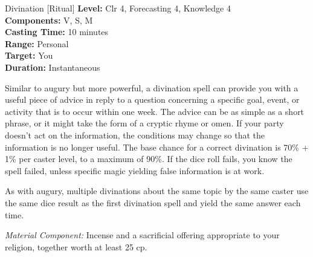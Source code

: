 {Divination [Ritual]}
{
	\textbf{Level:}
	Clr 4, Forecasting 4, Knowledge 4\\
	\textbf{Components:}
	V, S, M\\
	\textbf{Casting Time:}
	10 minutes\\
	\textbf{Range:}
	Personal\\
	\textbf{Target:}
	You\\
	\textbf{Duration:}
	Instantaneous\\
}
{
	Similar to augury but more powerful, a divination spell can provide you with a useful piece of advice in reply to a question concerning a specific goal, event, or activity that is to occur within one week. The advice can be as simple as a short phrase, or it might take the form of a cryptic rhyme or omen. If your party doesn't act on the information, the conditions may change so that the information is no longer useful. The base chance for a correct divination is 70\% + 1\% per caster level, to a maximum of 90\%. If the dice roll fails, you know the spell failed, unless specific magic yielding false information is at work.

	As with augury, multiple divinations about the same topic by the same caster use the same dice result as the first divination spell and yield the same answer each time.

	\textit{Material Component:}
	Incense and a sacrificial offering appropriate to your religion, together worth at least 25 cp.

}
